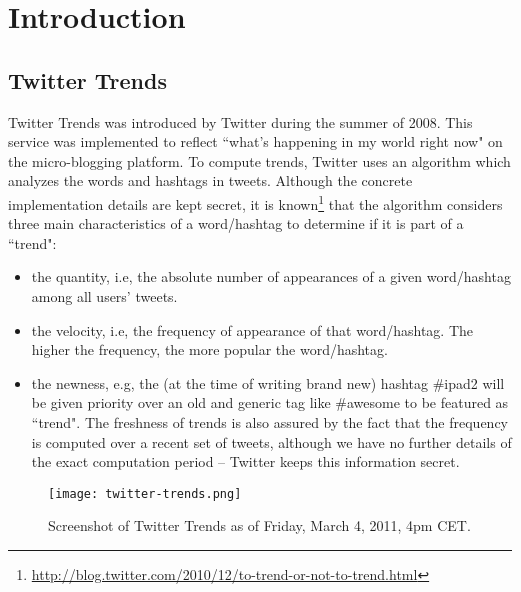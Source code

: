 \documentclass[runningheads,a4paper]{llncs}
\begin{document}
\section{Introduction}

\subsection{Twitter Trends}

Twitter Trends was introduced by Twitter during the summer of 2008. This service was implemented to reflect ``what's happening in my world right now" on the micro-blogging platform.
To compute trends, Twitter uses an algorithm which analyzes the words and hashtags in tweets. Although the concrete implementation details are kept secret, it is known\footnote{\url{http://blog.twitter.com/2010/12/to-trend-or-not-to-trend.html}} that the algorithm considers three main characteristics of a word/hashtag to determine if it is part of a ``trend":
\clearpage
\begin{itemize}
\item the quantity, i.e, the absolute number of appearances of a given word/hashtag among all users' tweets.
\item the velocity, i.e, the frequency of appearance of that word/hashtag. The higher the frequency, the more popular the word/hashtag.
\item the newness, e.g, the (at the time of writing brand new) hashtag \#ipad2 will be given priority over an old and generic tag like \#awesome to be featured as ``trend". The freshness of trends is also assured by the fact that the frequency is computed over a recent set of tweets, although we have no further details of the exact computation period -- Twitter keeps this information secret.
\end{itemize}
\begin{figure}[h!]
  \centering
    \texttt{[image: twitter-trends.png]}
  \caption{Screenshot of Twitter Trends as of Friday, March 4, 2011, 4pm CET.}
  \label{fig:dataflow}
\end{figure}
\end{document}
